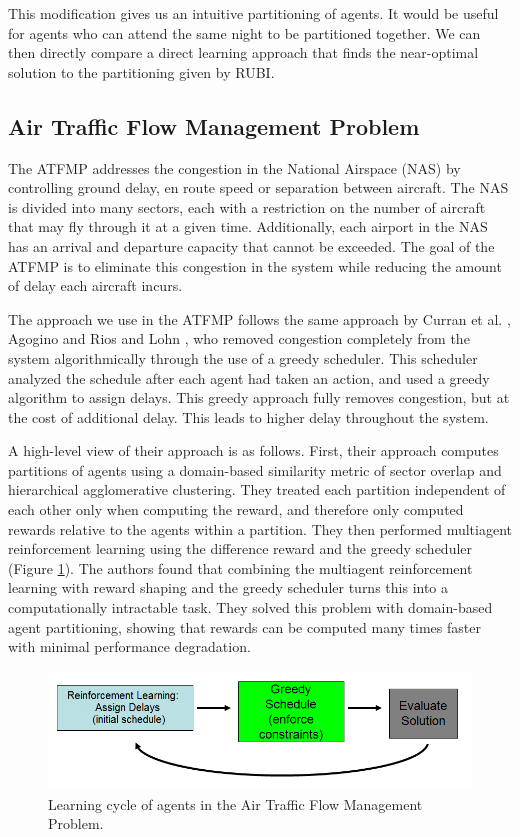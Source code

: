 \documentclass[smallcondensed]{svjour3}
\begin{document}
This modification gives us an intuitive partitioning of agents. It would be useful for agents who can attend the same night to be partitioned together. We can then directly compare a direct learning approach that finds the near-optimal solution to the partitioning given by RUBI.

\subsection{Air Traffic Flow Management Problem}

The ATFMP addresses the congestion in the National Airspace (NAS) by controlling ground delay, en route speed or separation between aircraft. The NAS is divided into many sectors, each with a restriction on the number of aircraft that may fly through it at a given time. Additionally, each airport in the NAS has an arrival and departure capacity that cannot be exceeded. The goal of the ATFMP is to eliminate this congestion in the system while reducing the amount of delay each aircraft incurs. 

The approach we use in the ATFMP follows the same approach by Curran et al. \cite{Curran:2013:AHC:2484920.2485183}, Agogino \cite{Agogino:2009:EEM:1570256.1570258} and Rios and Lohn \cite{Rios}, who removed congestion completely from the system algorithmically through the use of a greedy scheduler. This scheduler analyzed the schedule after each agent had taken an action, and used a greedy algorithm to assign delays. This greedy approach fully removes congestion, but at the cost of additional delay. This leads to higher delay throughout the system. 

A high-level view of their approach is as follows. First, their approach computes partitions of agents using a domain-based similarity metric of sector overlap and hierarchical agglomerative clustering. They treated each partition independent of each other only when computing the reward, and therefore only computed rewards relative to the agents within a partition. They then performed multiagent reinforcement learning using the difference reward and the greedy scheduler (Figure \ref{LearningCycle}). The authors found that combining the multiagent reinforcement learning with reward shaping and the greedy scheduler turns this into a computationally intractable task. They solved this problem with domain-based agent partitioning, showing that rewards can be computed many times faster with minimal performance degradation.

\begin{figure}[]
\centering
\includegraphics[width=.75\columnwidth]{LearningCycle}
\caption{Learning cycle of agents in the Air Traffic Flow Management Problem.}
\label{LearningCycle}
\end{figure}
\end{document}
